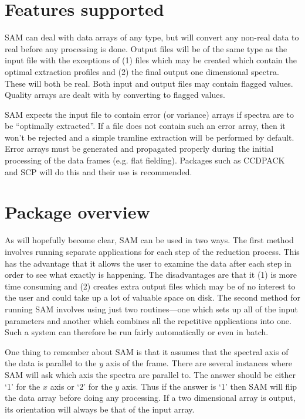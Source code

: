 \section{Features supported}

SAM can deal with data arrays of any type, but will convert any non-real data
to real before any processing is done.  Output files will be of the same type
as the input file with the exceptions of (1) files which may be created which
contain the optimal extraction profiles and (2) the final output one
dimensional spectra.  These will both be real.  Both input and output files
may contain flagged values.  Quality arrays are dealt with by converting to
flagged values.

SAM expects the input file to contain error (or variance) arrays if spectra
are to be ``optimally extracted''.  If a file does not contain such an error
array, then it won't be rejected and a simple tramline extraction will be
performed by default.  Error arrays must be generated and propagated properly
during the initial processing of the data frames (e.g. flat fielding). 
Packages such as CCDPACK and SCP will do this and their use is recommended.

\section{Package overview}

As will hopefully become clear, SAM can be used in two ways.  The first method
involves running separate applications for each step of the reduction process.
This has the advantage that it allows the user to examine the data after each
step in order to see what exactly is happening.  The disadvantages are that it
(1) is more time consuming and (2) creates extra output files which may be of
no interest to the user and could take up a lot of valuable space on disk. 
The second method for running SAM involves using just two routines---one
which  sets up all of the input parameters and another which combines all the
repetitive applications into one. Such a system can therefore be run fairly
automatically or even in batch.

One thing to remember about SAM is that it assumes that the spectral axis of
the data is parallel to the $y$ axis of the frame.  There are several
instances where SAM will ask which axis the spectra are parallel to.  The
answer should be either `1' for the $x$ axis or `2' for the $y$ axis.  Thus if
the answer is `1' then SAM will flip the data array before doing any
processing.  If a two dimensional array is output, its orientation will always
be that of the input array.


